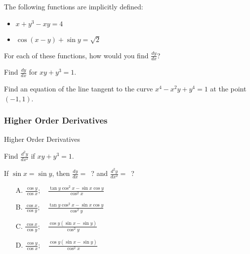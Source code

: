 \documentclass[cal1spr16Lectures.tex]{subfiles}
\begin{document}
\begin{frame}%
\begin{que} The following functions are \alert{implicitly} defined:
\begin{itemize}
\item $x+y^3-xy=4$
\item $\cos(x-y)+\sin y = \sqrt{2}$
\end{itemize}
For each of these functions, how would you find $\textstyle\frac{dy}{dx}$?
\end{que}
\end{frame}

\begin{frame}{}
\begin{exe} Find $\textstyle\frac{dy}{dx}$ for $xy+y^3=1$. \end{exe}
\begin{exe} Find an equation of the line tangent to the curve $x^4-x^2 y+y^4=1$ at the point $(-1,1)$. \end{exe}
\end{frame}

\subsubsection{Higher Order Derivatives}

\begin{frame}{\small Higher Order Derivatives}
\begin{ex} Find $\textstyle\frac{d^2 y}{dx^2}$ if $xy+y^3=1$. \end{ex}
\end{frame}

\begin{frame}
\begin{exe}
If $\sin x=\sin y$, then $\textstyle\frac{dy}{dx}=$\ ? and $\textstyle\frac{d^2y}{dx^2}=$\ ?
\begin{itemize}
\item[A. ]$\frac{\cos y}{\cos x};\quad \frac{\tan y\cos^2x-\sin x\cos y}{\cos^2x}$
\item[B. ]$\frac{\cos x}{\cos y};\quad \frac{\tan y\cos^2x-\sin x\cos y}{\cos^2y}$
\item[C. ]$\frac{\cos x}{\cos y};\quad \frac{\cos y(\sin x-\sin y)}{\cos^2 y}$
\item[D. ]$\frac{\cos y}{\cos x};\quad \frac{\cos y(\sin x-\sin y)}{\cos^2 x}$
\end{itemize}
\end{exe}
\end{frame}
\end{document}
